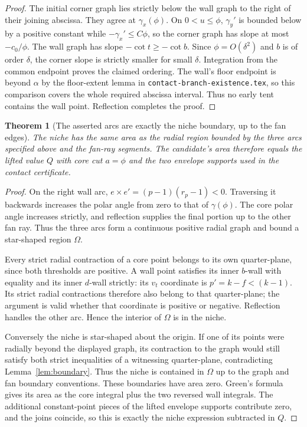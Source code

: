 \documentclass[11pt]{article}
\newtheorem{theorem}{Theorem}[section]
\begin{document}
\begin{proof}
The initial corner graph lies strictly below the wall graph to the right of their joining abscissa. They agree at $\gamma_x(\phi)$. On $0<u\le\phi$, $\gamma_y'$ is bounded below by a positive constant while $-\gamma_x'\le C\phi$, so the corner graph has slope at most $-c_0/\phi$. The wall graph has slope $-\cot t\ge-\cot b$. Since $\phi=O(\delta^2)$ and $b$ is of order $\delta$, the corner slope is strictly smaller for small $\delta$. Integration from the common endpoint proves the claimed ordering. The wall's floor endpoint is beyond $\alpha$ by the floor-extent lemma in \texttt{contact-branch-existence.tex}, so this comparison covers the whole required abscissa interval. Thus no early tent contains the wall point. Reflection completes the proof.
\end{proof}

\begin{theorem}[The asserted arcs are exactly the niche boundary, up to the fan edges]\label{thm:niche}
The niche has the same area as the radial region bounded by the three arcs specified above and the fan-ray segments. The candidate's area therefore equals the lifted value $Q$ with core cut $a=\phi$ and the two envelope supports used in the contact certificate.
\end{theorem}
\begin{proof}
On the right wall arc, $e\times e'=(p-1)(r_p-1)<0$. Traversing it backwards increases the polar angle from zero to that of $\gamma(\phi)$. The core polar angle increases strictly, and reflection supplies the final portion up to the other fan ray. Thus the three arcs form a continuous positive radial graph and bound a star-shaped region $\Omega$.

Every strict radial contraction of a core point belongs to its own quarter-plane, since both thresholds are positive. A wall point satisfies its inner $b$-wall with equality and its inner $d$-wall strictly: its $v_t$ coordinate is $p'=k-f<(k-1)$. Its strict radial contractions therefore also belong to that quarter-plane; the argument is valid whether that coordinate is positive or negative. Reflection handles the other arc. Hence the interior of $\Omega$ is in the niche.

Conversely the niche is star-shaped about the origin. If one of its points were radially beyond the displayed graph, its contraction to the graph would still satisfy both strict inequalities of a witnessing quarter-plane, contradicting Lemma~\ref{lem:boundary}. Thus the niche is contained in $\Omega$ up to the graph and fan boundary conventions. These boundaries have area zero. Green's formula gives its area as the core integral plus the two reversed wall integrals. The additional constant-point pieces of the lifted envelope supports contribute zero, and the joins coincide, so this is exactly the niche expression subtracted in $Q$.
\end{proof}
\end{document}
